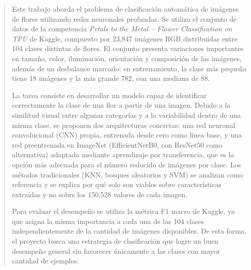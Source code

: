 \begin{abstract}
Este trabajo aborda el problema de clasificación automática de imágenes de flores utilizando redes neuronales profundas. Se utiliza el conjunto de datos de la competencia \textit{Petals to the Metal -- Flower Classification on TPU} de Kaggle, compuesto por 23,847 imágenes RGB distribuidas entre 104 clases distintas de flores. El conjunto presenta variaciones importantes en tamaño, color, iluminación, orientación y composición de las imágenes, además de un desbalance marcado: en entrenamiento, la clase más pequeña tiene 18 imágenes y la más grande 782, con una mediana de 88.

La tarea consiste en desarrollar un modelo capaz de identificar correctamente la clase de una flor a partir de una imagen. Debido a la similitud visual entre algunas categorías y a la variabilidad dentro de una misma clase, se proponen dos arquitecturas concretas: una red neuronal convolucional (CNN) propia, entrenada desde cero como línea base, y una red preentrenada en ImageNet (EfficientNetB0, con ResNet50 como alternativa) adaptada mediante aprendizaje por transferencia, que es la opción más adecuada para el número reducido de imágenes por clase. Los métodos tradicionales (KNN, bosques aleatorios y SVM) se analizan como referencia y se explica por qué solo son viables sobre características extraídas y no sobre los 150,528 valores de cada imagen.

Para evaluar el desempeño se utiliza la métrica F1 macro de Kaggle, ya que asigna la misma importancia a cada una de las 104 clases independientemente de la cantidad de imágenes disponibles. De esta forma, el proyecto busca una estrategia de clasificación que logre un buen desempeño general sin favorecer únicamente a las clases con mayor cantidad de ejemplos.
\end{abstract}
